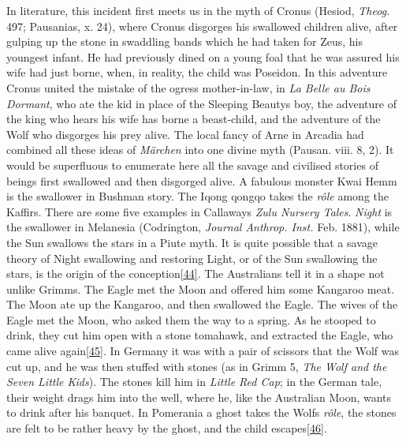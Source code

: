 \documentclass[14pt,a4paper]{memoir}
\begin{document}
In literature, this incident first meets us in the myth of Cronus
(Hesiod, \emph{Theog.} 497; Pausanias, x. 24), where Cronus disgorges
his swallowed children alive, after gulping up the stone in swaddling
bands which he had taken for Zeus, his youngest infant. He had
previously dined on a young foal that he was assured his wife had just
borne, when, in reality, the child was Poseidon. In this adventure
Cronus united the mistake of the ogress mother-in-law, in \emph{La Belle
au Bois Dormant}, who ate the kid in place of the Sleeping
Beauty\textquotesingle s boy, the adventure of the king who hears his
wife has borne a beast-child, and the adventure of the Wolf who
disgorges his prey alive. The local fancy of Arne in Arcadia had
combined all these ideas of \emph{Märchen} into one divine myth (Pausan.
viii. 8, 2). It would be superfluous to enumerate here all the savage
and civilised stories of beings first swallowed and then disgorged
alive. A fabulous monster Kwai Hemm is the swallower in Bushman story.
The Iqong qongqo takes the \emph{rôle} among the Kaffirs. There are some
five examples in Callaway\textquotesingle s \emph{Zulu Nursery Tales}.
\emph{Night} is the swallower in Melanesia (Codrington, \emph{Journal
Anthrop. Inst.} Feb. 1881), while the Sun swallows the stars in a Piute
myth. It is quite possible that a savage theory of Night swallowing and
restoring Light, or of the Sun swallowing the stars, is the origin of
the
conception\protect\hypertarget{4533318093929944247_33931-h-0.htm.xhtmlux5cux23FNanchor_44}{}{}\protect\hyperlink{4533318093929944247_33931-h-0.htm.xhtmlux5cux23Footnote_44}{{[}44{]}}.
The Australians tell it in a shape not unlike Grimm\textquotesingle s.
The Eagle met the Moon and offered him some Kangaroo meat. The Moon ate
up the Kangaroo, and then swallowed the Eagle. The wives of the Eagle
met the Moon, who asked them the way to a spring. As he stooped to
drink, they cut him open with a stone tomahawk, and extracted the Eagle,
who came alive
again\protect\hypertarget{4533318093929944247_33931-h-0.htm.xhtmlux5cux23FNanchor_45}{}{}\protect\hyperlink{4533318093929944247_33931-h-0.htm.xhtmlux5cux23Footnote_45}{{[}45{]}}.
In Germany it was with a pair of scissors that the Wolf was cut up, and
he was then stuffed with stones (as in Grimm 5, \emph{The Wolf and the
Seven Little Kids}). The stones kill him in \emph{Little Red Cap}; in
the German tale, their weight drags him into the well, where he, like
the Australian Moon, wants to drink after his banquet. In Pomerania a
ghost takes the Wolf\textquotesingle s \emph{rôle}, the stones are felt
to be rather \textquotesingle heavy\textquotesingle{} by the ghost, and
the child
escapes\protect\hypertarget{4533318093929944247_33931-h-0.htm.xhtmlux5cux23FNanchor_46}{}{}\protect\hyperlink{4533318093929944247_33931-h-0.htm.xhtmlux5cux23Footnote_46}{{[}46{]}}.
\end{document}
